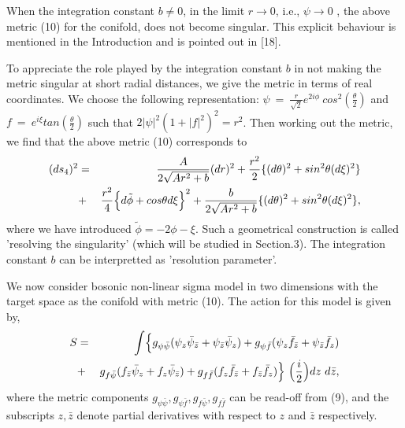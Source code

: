 \documentclass[a4paper,12pt]{article}
\begin{document}
{{\vspace{0.5cm}

When the integration constant $b\neq 0$, in the limit $r\rightarrow 0$, 
i.e., $\psi \rightarrow 0$ 
, the above metric (10) for the conifold, does not become singular. 
This explicit
behaviour is mentioned in the Introduction and is pointed out in [18].   

\vspace{0.5cm}

To appreciate the role played by the integration constant $b$ in not making
the metric singular at short radial distances, we give the metric in terms 
of real coordinates. We choose the following representation: $\psi \ =\ 
\frac{r}{\sqrt{2}}e^{2i\phi}\ cos^2(\frac{\theta}{2})$ and $f\ =\ e^{i\xi}
tan(\frac{\theta}{2})$ such that $2|\psi|^2(1+|f|^2)^2 = r^2$. Then working out the metric, we find that the above metric (10) corresponds to
\begin{eqnarray}
(ds_4)^2&=&\frac{A}{2\sqrt{Ar^2+b}} (dr)^2+\frac{r^2}{2}\{ (d\theta)^2 + 
sin^2{\theta} (d\xi )^2\} \nonumber \\
&+&\frac{r^2}{4}{\Bigl\{d\tilde{\phi} + cos{\theta}d\xi\Bigr\} }^2
+\frac{b}{2\sqrt{Ar^2+b}} 
\{ (d\theta)^2 + sin^2\theta (d\xi)^2\},
\end{eqnarray}
where we have introduced $\tilde{\phi}=-2\phi-\xi$. 
Such a geometrical construction is called 'resolving the 
singularity' 
(which will be studied in Section.3).  
The integration constant $b$ can be 
interpretted as 'resolution parameter'.  

\vspace{0.5cm}

We now consider bosonic non-linear sigma model in two dimensions with the 
target space as the conifold with metric (10). 
The action for this model is
given by,
\begin{eqnarray}
S&=& \int \Bigl\{ g_{\psi \bar{\psi}}({\psi}_z{\bar{\psi}}_{\bar{z}}+
{\psi}_{\bar{z}}{\bar{\psi}}_z)+g_{\psi\bar{f}}({\psi}_z{\bar{f}}_{\bar{z}}
+{\psi}_{\bar{z}}{\bar{f}}_z) \nonumber \\
&+&g_{f\bar{\psi}}(f_{\bar{z}}{\bar{\psi}}_z+f_z{\bar{\psi}}_{\bar{z}})+
g_{f\bar{f}}(f_z{\bar{f}}_{\bar{z}}+f_{\bar{z}}{\bar{f}}_z)\Bigr\}\ \Big(
\frac{i}{2}\Big) dz\ d\bar{z},
\end{eqnarray}
where the metric components $g_{\psi \bar{\psi}}, g_{\psi \bar{f}}, 
g_{f\bar{\psi}}, g_{f\bar{f}}$ can be read-off from (9), and the subscripts
$z,\bar{z}$ denote partial derivatives with respect to $z$ and $\bar{z}$ 
respectively.

}}
\end{document}
